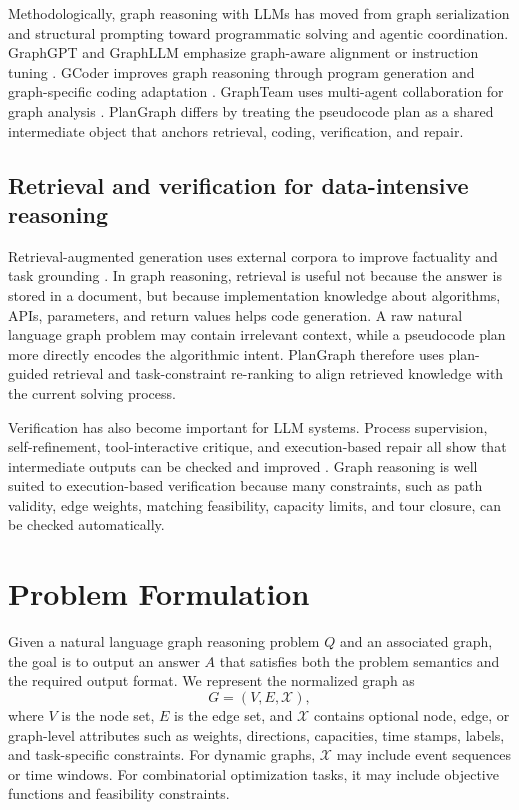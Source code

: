 \documentclass[pdflatex,iicol,sn-mathphys-num]{sn-jnl}
\theoremstyle{thmstyleone}
\theoremstyle{thmstyletwo}
\theoremstyle{thmstylethree}
\begin{document}
Methodologically, graph reasoning with LLMs has moved from graph serialization and structural prompting toward programmatic solving and agentic coordination. GraphGPT and GraphLLM emphasize graph-aware alignment or instruction tuning \cite{tang2024graphgpt,chai2023graphllm}. GCoder improves graph reasoning through program generation and graph-specific coding adaptation \cite{zhang2025gcoder}. GraphTeam uses multi-agent collaboration for graph analysis \cite{li2024graphteam}. PlanGraph differs by treating the pseudocode plan as a shared intermediate object that anchors retrieval, coding, verification, and repair.

\subsection{Retrieval and verification for data-intensive reasoning}

Retrieval-augmented generation uses external corpora to improve factuality and task grounding \cite{karpukhin2020dpr,lewis2020rag,izacard2023atlas,gao2024ragsurvey}. In graph reasoning, retrieval is useful not because the answer is stored in a document, but because implementation knowledge about algorithms, APIs, parameters, and return values helps code generation. A raw natural language graph problem may contain irrelevant context, while a pseudocode plan more directly encodes the algorithmic intent. PlanGraph therefore uses plan-guided retrieval and task-constraint re-ranking to align retrieved knowledge with the current solving process.

Verification has also become important for LLM systems. Process supervision, self-refinement, tool-interactive critique, and execution-based repair all show that intermediate outputs can be checked and improved \cite{madaan2023selfrefine,lightman2023processreward,critic2024}. Graph reasoning is well suited to execution-based verification because many constraints, such as path validity, edge weights, matching feasibility, capacity limits, and tour closure, can be checked automatically.

\section{Problem Formulation}\label{sec:problem}

Given a natural language graph reasoning problem $Q$ and an associated graph, the goal is to output an answer $A$ that satisfies both the problem semantics and the required output format. We represent the normalized graph as
\begin{equation}
G=(V,E,\mathcal{X}),
\end{equation}
where $V$ is the node set, $E$ is the edge set, and $\mathcal{X}$ contains optional node, edge, or graph-level attributes such as weights, directions, capacities, time stamps, labels, and task-specific constraints. For dynamic graphs, $\mathcal{X}$ may include event sequences or time windows. For combinatorial optimization tasks, it may include objective functions and feasibility constraints.
\end{document}
